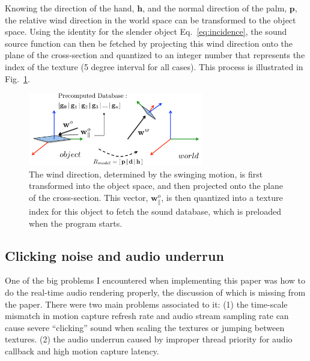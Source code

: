 \documentclass[tog]{acmsiggraph}
\begin{document}
Knowing the direction of the hand, $\mathbf{h}$, and the normal direction of the palm, $\mathbf{p}$, the relative wind direction in the world space can be transformed to the object space. Using the identity for the slender object Eq.~\ref{eq:incidence}, the sound source function can then be fetched by projecting this wind direction onto the plane of the cross-section and quantized to an integer number that represents the index of the texture (5 degree interval for all cases). This process is illustrated in Fig.~\ref{fig:transform}. 

\begin{figure}[ht]
  \centering
  \includegraphics[width=3.0in]{images/transform.pdf}
  \caption{The wind direction, determined by the swinging motion, is first transformed into the object space, and then projected onto the plane of the cross-section. This vector, $\mathbf{w}^{o}_{\|}$, is then quantized into a texture index for this object to fetch the sound database, which is preloaded when the program starts.}
  \label{fig:transform}
\end{figure}

\subsection{Clicking noise and audio underrun}

One of the big problems I encountered when implementing this paper was how to do the real-time audio rendering properly, the discussion of which is missing from the paper. There were two main problems associated to it: (1) the time-scale mismatch in motion capture refresh rate and audio stream sampling rate can cause severe ``clicking'' sound when scaling the textures or jumping between textures. (2) the audio underrun caused by improper thread priority for audio callback and high motion capture latency.
\end{document}
